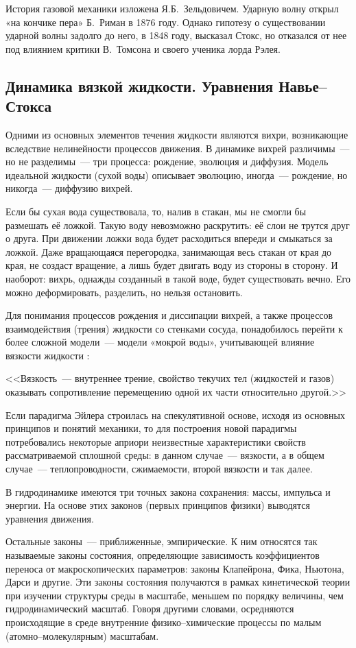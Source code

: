 История газовой механики изложена Я.Б.~Зельдовичем. Ударную волну открыл «на кончике пера» Б.~Риман в 1876 году. 
Однако гипотезу о существовании ударной волны задолго до него, в 1848 году, высказал Стокс, но отказался от 
нее под влиянием критики В.~Томсона и своего ученика лорда Рэлея.

\subsection{Динамика вязкой жидкости. Уравнения Навье--Стокса}

Одними из основных элементов течения жидкости являются вихри, возникающие вследствие нелинейности процессов 
движения. В динамике вихрей различимы~--- но не разделимы~--- три процесса: рождение, эволюция и диффузия.
 Модель идеальной жидкости (сухой воды) описывает эволюцию, иногда~--- рождение, но никогда~--- диффузию вихрей.

Если бы сухая вода существовала, то, налив в стакан, мы не смогли бы размешать её ложкой. Такую воду невозможно 
раскрутить: её слои не трутся друг о друга. При движении ложки вода будет расходиться впереди и смыкаться за ложкой. 
Даже вращающаяся перегородка, занимающая весь стакан от края до края, не создаст вращение, а лишь будет 
двигать воду из стороны в сторону. И наоборот: вихрь, однажды созданный в такой воде, будет существовать вечно. 
Его можно деформировать, разделить, но нельзя остановить.

Для понимания процессов рождения и диссипации вихрей, а также процессов взаимодействия (трения) жидкости 
со стенками сосуда, понадобилось перейти к более сложной модели~--- модели «мокрой воды», учитывающей 
влияние вязкости жидкости \cite{wiki}:

<<Вязкость~--- внутреннее трение, свойство текучих тел (жидкостей и газов) оказывать сопротивление 
перемещению одной их части относительно другой.>>

Если парадигма Эйлера строилась на спекулятивной основе, исходя из основных принципов и понятий механики, 
то для построения новой парадигмы потребовались некоторые априори неизвестные характеристики свойств 
рассматриваемой сплошной среды: в данном случае~--- вязкости, а в общем случае~--- теплопроводности, 
сжимаемости, второй вязкости и так далее.

В гидродинамике имеются три точных закона сохранения: массы, импульса и энергии. На основе этих законов 
(первых принципов физики) выводятся уравнения движения.

Остальные законы~--- приближенные, эмпирические. К ним относятся так называемые законы состояния, 
определяющие зависимость коэффициентов переноса от макроскопических параметров: законы Клапейрона, Фика, 
Ньютона, Дарси и другие. Эти законы состояния получаются в рамках кинетической теории при изучении 
структуры среды в масштабе, меньшем по порядку величины, чем гидродинамический масштаб. Говоря другими словами, 
осредняются происходящие в среде внутренние физико--химические процессы по малым (атомно--молекулярным) масштабам.

